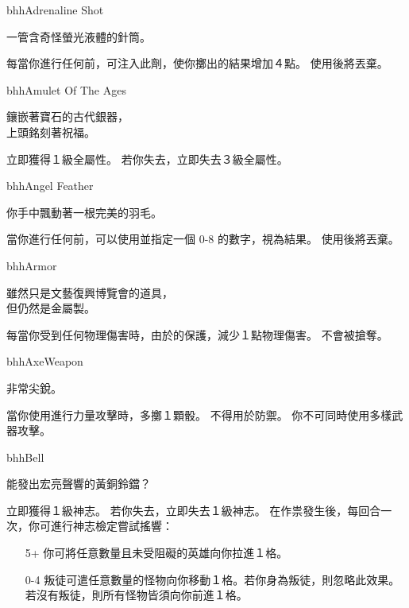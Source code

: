 %
\begin{ItemCard}{bhh}{Adrenaline Shot}{}
  \begin{CardStory}
    一管含奇怪螢光液體的針筒。
  \end{CardStory}
  每當你進行任何前，可注入此劑，使你擲出的結果增加４點。 \smallbreak
  使用後將\ThisName{}丟棄。\smallbreak
\end{ItemCard}%
\linebreak[0]%
\begin{ItemCard}{bhh}{Amulet Of The Ages}{}
  \begin{CardStory}
    鑲嵌著寶石的古代銀器，\\
    上頭銘刻著祝福。
  \end{CardStory}
  立即獲得１級全屬性。\smallbreak
  若你失去\ThisName{}，立即失去３級全屬性。\smallbreak
\end{ItemCard}%
\linebreak[0]%
\begin{ItemCard}{bhh}{Angel Feather}{}
  \begin{CardStory}
    你手中飄動著一根完美的羽毛。
  \end{CardStory}
  當你進行任何\RollAny{}前，可以使用\ThisName{}並指定一個 0-8 的數字，視為\RollAny{}結果。\smallbreak
  使用後將\ThisName{}丟棄。\smallbreak
\end{ItemCard}%
\linebreak[0]%
\begin{ItemCard}{bhh}{Armor}{}
  \begin{CardStory}
    雖然只是文藝復興博覽會的道具，\\
    但仍然是金屬製。
  \end{CardStory}
  每當你受到任何物理傷害時，由於\ThisName{}的保護，減少１點物理傷害。\smallbreak
  \ThisName{}不會被搶奪。\smallbreak
\end{ItemCard}%
\linebreak[0]%
\begin{ItemCard}{bhh}{Axe}{Weapon}
  \begin{CardStory}
    非常尖銳。
  \end{CardStory}
  當你使用\ThisName{}進行力量攻擊時，多擲１顆骰。\smallbreak
  \ThisName{}不得用於防禦。\smallbreak
  你不可同時使用多樣武器攻擊。\smallbreak
\end{ItemCard}%
\linebreak[0]%
\begin{ItemCard}{bhh}{Bell}{}
  \begin{CardStory}
    能發出宏亮聲響的黃銅鈴鐺？
  \end{CardStory}
  立即獲得１級神志。\smallbreak
  若你失去\ThisName{}，立即失去１級神志。\smallbreak
  在作祟發生後，每回合一次，你可進行神志檢定嘗試搖響\ThisName{}：
  \begin{itemize}
    \item[5+] 你可將任意數量且未受阻礙的英雄向你拉進１格。
    \item[0-4] 叛徒可遣任意數量的怪物向你移動１格。若你身為叛徒，則忽略此效果。若沒有叛徒，則所有怪物皆須向你前進１格。
  \end{itemize}
\end{ItemCard}%
